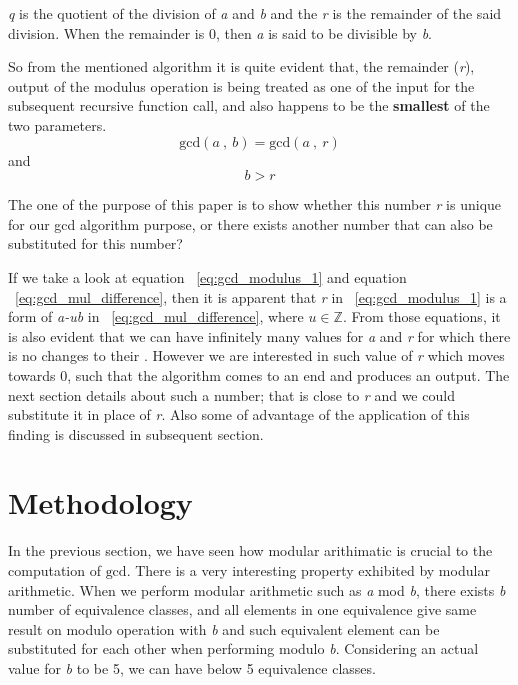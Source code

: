 \documentclass[conference,compsoc]{IEEEtran}
\newcommand{\Z}{{\mathbb Z}}
\newcommand{\var}[1]{\textit{#1}}
\renewcommand{\gcd}{\text{gcd}}
\begin{document}
\var{q} is the quotient of the division of \var{a} and \var{b} and the \var{r} is the remainder of the said division. When the remainder is 0, then \var{a} is said to be divisible by \var{b}.

So from the mentioned algorithm it is quite evident that, the remainder (\var{r}), output of the modulus operation is being treated as one of the input for the subsequent recursive function call, and also happens to be the \textbf{smallest} of the two parameters.
\begin{equation} \label{eq:gcd_modulus_1}
\gcd(a \>,\> b) = \gcd(a \>, \> r)
\end{equation}
and
\begin{equation*} \label{eq:gcd_modulus_2}
 b > r
\end{equation*}

The one of the purpose of this paper is to show whether this number \var{r} is unique for our gcd algorithm purpose, or there exists another number that can also be substituted for this number?

If we take a look at equation ~\ref{eq:gcd_modulus_1} and equation ~\ref{eq:gcd_mul_difference}, then it is apparent that \var {r} in  ~\ref{eq:gcd_modulus_1} is a form of \var{a-ub} in ~\ref{eq:gcd_mul_difference}, where $u\in\Z.$ From those equations, it is also evident that we can have infinitely many values for \var {a} and \var {r} for which there is no changes to their \gcd. However we are interested in such value of \var {r} which moves towards 0, such that the algorithm comes to an end and produces an output. The next section details about such a number; that is close to \var {r} and we could substitute it in place of \var {r}. Also some of advantage of the application of this finding is discussed in subsequent section.

\section{Methodology}
In the previous section, we have seen how modular arithimatic is crucial to the computation of $\gcd$. There is a very interesting property exhibited by modular arithmetic.
When we perform modular arithmetic such as \var{a} mod \var{b}, there exists
\var{b} number of equivalence classes, and all elements in one equivalence give same result on modulo operation with \var{b} and such equivalent element can be substituted for each other when performing modulo \var{b}.
\newline
Considering an actual value for \var{b} to be 5, we can have below 5 equivalence classes.
\end{document}
